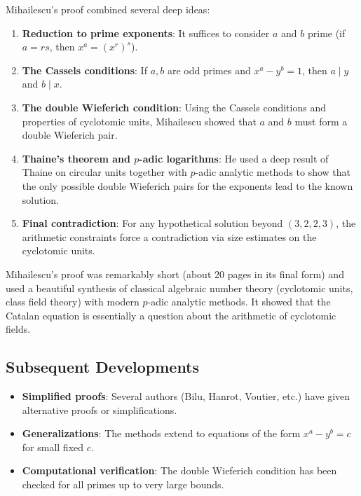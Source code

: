 Mihailescu's proof combined several deep ideas:

\begin{enumerate}
\item \textbf{Reduction to prime exponents}: It suffices to consider $a$ and $b$ prime (if $a = rs$, then $x^a = (x^r)^s$).
\item \textbf{The Cassels conditions}: If $a, b$ are odd primes and $x^a - y^b = 1$, then $a \mid y$ and $b \mid x$.
\item \textbf{The double Wieferich condition}: Using the Cassels conditions and properties of cyclotomic units, Mihailescu showed that $a$ and $b$ must form a double Wieferich pair.
\item \textbf{Thaine's theorem and $p$-adic logarithms}: He used a deep result of Thaine on circular units together with $p$-adic analytic methods to show that the only possible double Wieferich pairs for the exponents lead to the known solution.
\item \textbf{Final contradiction}: For any hypothetical solution beyond $(3, 2, 2, 3)$, the arithmetic constraints force a contradiction via size estimates on the cyclotomic units.
\end{enumerate}

\begin{highlightbox}
Mihailescu's proof was remarkably short (about 20 pages in its final form) and used a beautiful synthesis of classical algebraic number theory (cyclotomic units, class field theory) with modern $p$-adic analytic methods. It showed that the Catalan equation is essentially a question about the arithmetic of cyclotomic fields.
\end{highlightbox}

\subsection{Subsequent Developments}

\begin{itemize}
\item \textbf{Simplified proofs}: Several authors (Bilu, Hanrot, Voutier, etc.) have given alternative proofs or simplifications.
\item \textbf{Generalizations}: The methods extend to equations of the form $x^a - y^b = c$ for small fixed $c$.
\item \textbf{Computational verification}: The double Wieferich condition has been checked for all primes up to very large bounds.
\end{itemize}

